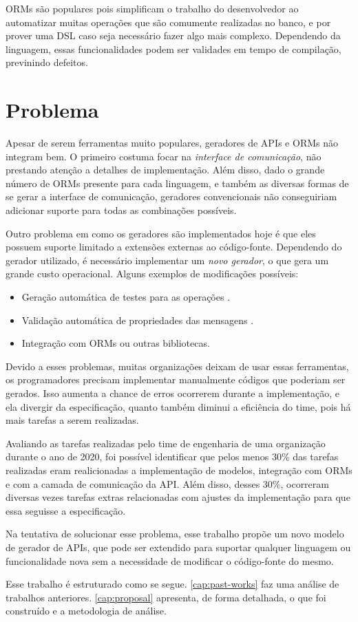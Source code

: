 ORMs são populares pois simplificam o trabalho do desenvolvedor ao automatizar muitas
operações que são comumente realizadas no banco, e por prover uma DSL caso seja
necessário fazer algo mais complexo. Dependendo da linguagem, essas funcionalidades
podem ser validades em tempo de compilação, previnindo defeitos.

\section{Problema}

Apesar de serem ferramentas muito populares, geradores de APIs e ORMs não integram
bem. O primeiro costuma focar na \textit{interface de comunicação}, não prestando
atenção a detalhes de implementação. Além disso, dado o grande número de ORMs
presente para cada linguagem, e também as diversas formas de se gerar a interface
de comunicação, geradores convencionais não conseguiriam adicionar suporte para
todas as combinações possíveis.

Outro problema em como os geradores são implementados hoje é que eles possuem
suporte limitado a extensões externas ao código-fonte. Dependendo do gerador
utilizado, é necessário implementar um \textit{novo gerador}, o que gera um grande
custo operacional. Alguns exemplos de modificações possíveis:

\begin{itemize}
\item
  Geração automática de testes para as operações \cite{9159071}.
\item
  Validação automática de propriedades das mensagens \cite{envoy:protoc-gen-validate}.
\item
  Integração com ORMs ou outras bibliotecas.
\end{itemize}

Devido a esses problemas, muitas organizações deixam de usar essas ferramentas, os
programadores precisam implementar manualmente códigos que poderiam ser gerados.
Isso aumenta a chance de erros ocorrerem durante a implementação, e ela divergir da
especificação, quanto também diminui a eficiência do time, pois há mais tarefas a
serem realizadas.

Avaliando as tarefas realizadas pelo time de engenharia de uma organização durante o
ano de 2020, foi possível identificar que pelos menos 30\% das tarefas realizadas
eram realicionadas a implementação de modelos, integração com ORMs e com a camada
de comunicação da API. Além disso, desses 30\%, ocorreram diversas vezes tarefas
extras relacionadas com ajustes da implementação para que essa seguisse a especificação.

Na tentativa de solucionar esse problema, esse trabalho propõe um novo modelo de
gerador de APIs, que pode ser extendido para suportar qualquer linguagem ou funcionalidade
nova sem a necessidade de modificar o código-fonte do mesmo.

Esse trabalho é estruturado como se segue. \cref{cap:past-works} faz uma análise
de trabalhos anteriores. \cref{cap:proposal} apresenta, de forma detalhada, o que
foi construído e a metodologia de análise.
